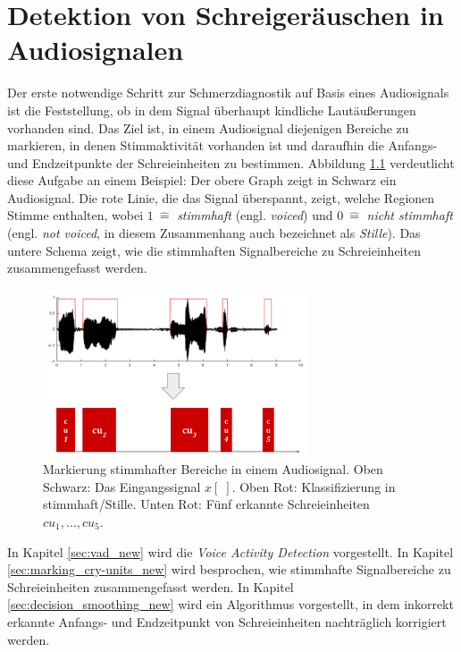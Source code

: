 \chapter{Detektion von Schreigeräuschen in Audiosignalen}
\label{sec:vad}

Der erste notwendige Schritt zur Schmerzdiagnostik auf Basis eines Audiosignals ist die Feststellung, ob in dem Signal überhaupt kindliche Lautäußerungen vorhanden sind. Das Ziel ist, in einem Audiosignal diejenigen Bereiche zu markieren, in denen Stimmaktivität vorhanden ist und daraufhin die Anfangs- und Endzeitpunkte  der Schreieinheiten zu bestimmen. Abbildung  \ref{img:vad01} verdeutlicht diese Aufgabe an einem Beispiel: Der obere Graph zeigt in Schwarz ein Audiosignal. Die rote Linie, die das Signal überspannt, zeigt, welche Regionen Stimme enthalten, wobei $1 \: \hat{=} $ \emph{stimmhaft} (engl. \emph{voiced}) und $0 \: \hat{=}  $ \emph{nicht stimmhaft} (engl. \emph{not voiced}, in diesem Zusammenhang auch bezeichnet als \emph{Stille}). Das untere Schema zeigt, wie die stimmhaften Signalbereiche zu Schreieinheiten zusammengefasst werden.

\begin{figure}[h]
	\centering
	\includegraphics[width=0.7\textwidth]{bilder/vad_introduction02.png}
	\caption[Markierung stimmhafter Bereiche in einem Audiosignal]{Markierung stimmhafter Bereiche in einem Audiosignal. Oben Schwarz: Das Eingangssignal $x[\;]$. Oben Rot: Klassifizierung in stimmhaft/Stille. Unten Rot: Fünf erkannte Schreieinheiten $cu_1 , \ldots , cu_5$.}
	\label{img:vad01}
\end{figure}

In Kapitel \ref{sec:vad_new} wird die \emph{Voice Activity Detection} vorgestellt. In Kapitel \ref{sec:marking_cry-units_new} wird besprochen, wie stimmhafte Signalbereiche zu Schreieinheiten zusammengefasst werden. In Kapitel \ref{sec:decision_smoothing_new} wird ein Algorithmus vorgestellt, in dem inkorrekt erkannte Anfangs- und Endzeitpunkt von Schreieinheiten nachträglich korrigiert werden.


